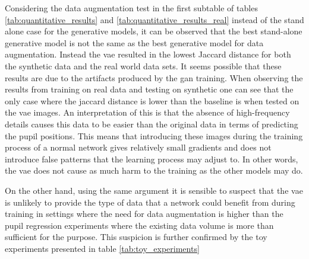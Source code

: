 Considering the data augmentation test in the first subtable of tables \ref{tab:quantitative_results} and \ref{tab:quantitative_results_real} instead of the stand alone case for the generative models, it can be observed that the best stand-alone generative model is not the same as the best generative model for data augmentation. Instead the \acrshort{vae} resulted in the lowest Jaccard distance for both the synthetic data and the real world data sets. It seems possible that these results are due to the artifacts produced by the \acrshort{gan} training. When observing the results from training on real data and testing on synthetic one can see that the only case where the jaccard distance is lower than the baseline is when tested on the \acrshort{vae} images. An interpretation of this is that the absence of high-frequency details causes this data to be easier than the original data in terms of predicting the pupil positions. This means that introducing these images during the training process of a normal network gives relatively small gradients and does not introduce false patterns that the learning process may adjust to. In other words, the \acrshort{vae} does not cause as much harm to the training as the other models may do. 

On the other hand, using the same argument it is sensible to suspect that the \acrshort{vae} is unlikely to provide the type of data that a network could benefit from during training in settings where the need for data augmentation is higher than the pupil regression experiments where the existing data volume is more than sufficient for the purpose. This suspicion is further confirmed by the toy experiments presented in table \ref{tab:toy_experiments}


